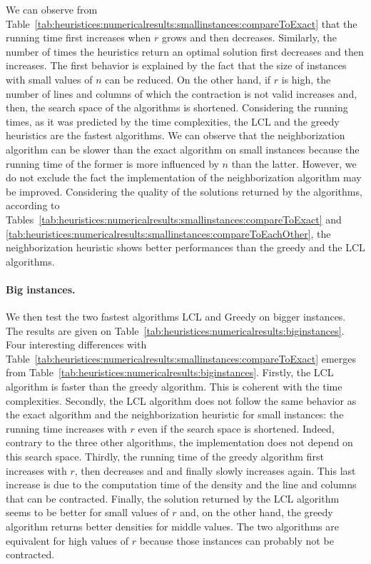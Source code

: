 We can observe from Table~\ref{tab:heuristices:numericalresults:smallinstances:compareToExact} that the running time first increases when $r$ grows and then decreases. Similarly, the number of times the heuristics return an optimal solution first decreases and then increases. The first behavior is explained by the fact that the size of instances with small values of $n$ can be reduced. On the other hand, if $r$ is high, the number of lines and columns of which the contraction is not valid increases and, then, the search space of the algorithms is shortened. Considering the running times, as it was predicted by the time complexities, the LCL and the greedy heuristics are the fastest algorithms. We can observe that the neighborization algorithm can be slower than the exact algorithm on small instances because the running time of the former is more influenced by $n$ than the latter. However, we do not exclude the fact the implementation of the neighborization algorithm may be improved. Considering the quality of the solutions returned by the algorithms, according to Tables~\ref{tab:heuristices:numericalresults:smallinstances:compareToExact} and \ref{tab:heuristices:numericalresults:smallinstances:compareToEachOther}, the neighborization heuristic shows better performances than the greedy and the LCL algorithms.


\paragraph{Big instances. }
We then test the two fastest algorithms LCL and Greedy on bigger instances. The results are given on Table~\ref{tab:heuristices:numericalresults:biginstances}.  Four interesting differences with Table~\ref{tab:heuristices:numericalresults:smallinstances:compareToExact} emerges from Table~\ref{tab:heuristices:numericalresults:biginstances}. Firstly, the LCL algorithm is faster than the greedy algorithm. This is coherent with the time complexities. Secondly, the LCL algorithm does not follow the same behavior as the exact algorithm and the neighborization heuristic for small instances: the running time increases with $r$ even if the search space is shortened. Indeed, contrary to the three other algorithms, the implementation does not depend on this search space. Thirdly, the running time of the greedy algorithm first increases with $r$, then decreases and and finally slowly increases again. This last increase is due to the computation time of the density and the line and columns that can be contracted.  Finally, the solution returned by the LCL algorithm seems to be better for small values of $r$ and, on the other hand, the greedy algorithm returns better densities for middle values. The two algorithms are equivalent for high values of $r$ because those instances can probably not be contracted.


